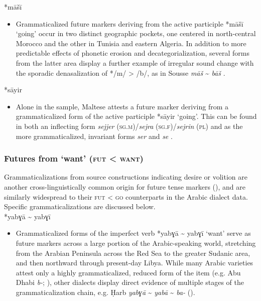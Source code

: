 \documentclass[output=paper]{langsci/langscibook}
\begin{document}
*māšī

\begin{itemize}

  \item[]
Grammaticalized future markers deriving from the active participle *māšī ‘going’ occur in two distinct geographic pockets, one centered in north-central Morocco and the other in Tunisia and eastern Algeria. In addition to more predictable effects of phonetic erosion and decategorialization, several forms from the latter area display a further example of irregular sound change with the sporadic denasalization of */m/ > /b/, as in Sousse \textit{māš} {\textasciitilde} \textit{bāš} \citep{Talmoudi1980}.
\end{itemize}
 
*sāyir

\begin{itemize}

 \item[]
Alone in the sample, Maltese attests a future marker deriving from a grammaticalized form of the active participle *sāyir ‘going’. This can be found in both an inflecting form \textit{sejjer} (\textsc{sg.m})/\textit{sejra} (\textsc{sg.f})/\textit{sejrin} (\textsc{pl}) and as the more grammaticalized, invariant forms \textit{ser} and \textit{se} \citep{Vanhove1993}.
\end{itemize}

\subsubsection{ Futures from ‘want’ (\textsc{fut} < \textsc{want})}

Grammaticalizations from source constructions indicating desire or volition are another cross-linguistically common origin for future tense markers (\citealt{Bybee1994,HeineKuteva2002}), and are similarly widespread to their \textsc{fut} < \textsc{go} counterparts in the Arabic dialect data. Specific grammaticalizations are discussed below.\\
 
*yabɣā {\textasciitilde} yabɣī 

\begin{itemize}

  \item[]
Grammaticalized forms of the imperfect verb *yabɣā {\textasciitilde} yabɣī ‘want’ serve as future markers across a large portion of the Arabic-speaking world, stretching from the Arabian Peninsula across the Red Sea to the greater Sudanic area, and then northward through present-day Libya. While many Arabic varieties attest only a highly grammaticalized, reduced form of the item (e.g. Abu Dhabi \textit{b-}; \citealt{Qafisheh1977}), other dialects display direct evidence of multiple stages of the grammaticalization chain, e.g. Ḥarb \textit{yabɣā} {\textasciitilde} \textit{yabā} {\textasciitilde} \textit{ba-} (\citealt{Il-Hazmy1975}).
\end{itemize}
 
\end{document}
